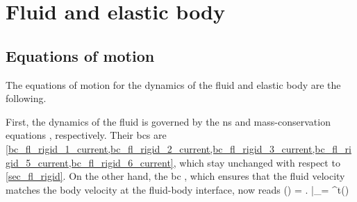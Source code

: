 

\section{Fluid and elastic body}\label{sec_fl_elastic_app}

\subsection{Equations of motion}
\label{app_sec_fl_elastic_equations_of_motion}

The equations of motion for the dynamics of the fluid and elastic body are the following.

First, the dynamics of the fluid is governed by the  \ac{ns} and mass-conservation equations \crefs{\eqsbfluc}, respectively. Their \acp{bc} are \cref{bc_fl_rigid_1_current,bc_fl_rigid_2_current,bc_fl_rigid_3_current,bc_fl_rigid_5_current,bc_fl_rigid_6_current}, which stay unchanged with respect to \cref{sec_fl_rigid}. On the other hand, the \ac{bc} , which ensures that the fluid velocity matches the body velocity at the fluid-body interface, now reads
\be
\label{bc_fl_ela_4_current}
\bvfc{}(\bxc) = \left.  \right|_{\bxr = \psi^t(\bxc)}   \pomcircouteqc
\ee



